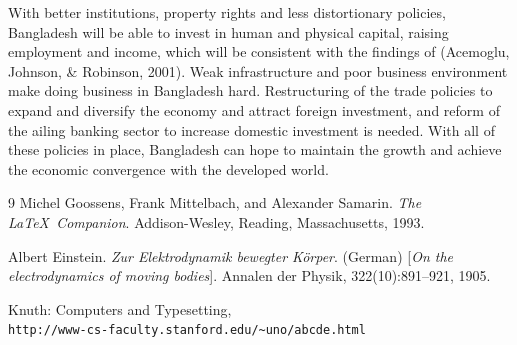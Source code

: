 \documentclass[11pt,a4paper]{article}
\begin{document}
With better institutions, property rights and less distortionary policies, Bangladesh will be able to invest in human and physical capital, raising employment and income, which will be consistent with the findings of (Acemoglu, Johnson, \& Robinson, 2001). Weak infrastructure and poor business environment make doing business in Bangladesh hard. Restructuring of the trade policies to expand and diversify the economy and attract foreign investment, and reform of the ailing banking sector to increase domestic investment is needed. With all of these policies in place, Bangladesh can hope to maintain the growth and achieve the economic convergence with the developed world. \cite{latexcompanion}

\newpage

\begin{thebibliography}{9}
Michel Goossens, Frank Mittelbach, and Alexander Samarin. 
\textit{The \LaTeX\ Companion}. 
Addison-Wesley, Reading, Massachusetts, 1993.

Albert Einstein. 
\textit{Zur Elektrodynamik bewegter K{\"o}rper}. (German) 
[\textit{On the electrodynamics of moving bodies}]. 
Annalen der Physik, 322(10):891–921, 1905.

Knuth: Computers and Typesetting,
\\\texttt{http://www-cs-faculty.stanford.edu/\~{}uno/abcde.html}
\end{thebibliography}
\end{document}
